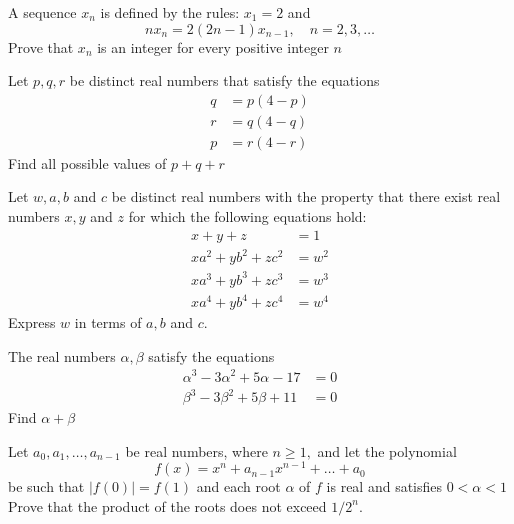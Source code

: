 \documentclass{pset}
\begin{document}
\begin{problems}
\begin{problem}[IrMO 1994 Q1]
    A sequence \(x_{n}\) is defined by the rules: \(x_{1}=2\) and
    $$
    n x_{n}=2(2 n-1) x_{n-1}, \quad n=2,3, \ldots
    $$
    Prove that \(x_{n}\) is an integer for every positive integer \(n\)
\end{problem}

\begin{problem}[IrMO 1994 Q7]
    Let \(p, q, r\) be distinct real numbers that satisfy the equations
    $$
    \begin{aligned}
    q &=p(4-p) \\
    r &=q(4-q) \\
    p &=r(4-r)
    \end{aligned}
    $$
    Find all possible values of \(p+q+r\)
\end{problem}

\begin{problem}[IrMO 1994 Q9]
    Let \(w, a, b\) and \(c\) be distinct real numbers with the property that there exist real numbers \(x, y\) and \(z\) for which the following equations hold:
    $$
    \begin{aligned}
    x+y+z &=1 \\
    x a^{2}+y b^{2}+z c^{2} &=w^{2} \\
    x a^{3}+y b^{3}+z c^{3} &=w^{3} \\
    x a^{4}+y b^{4}+z c^{4} &=w^{4}
    \end{aligned}
    $$
    Express \(w\) in terms of \(a, b\) and \(c .\)
\end{problem}

\begin{problem}[IrMO 1993 Q1]
    The real numbers \(\alpha, \beta\) satisfy the equations
    $$
    \begin{aligned}
    \alpha^{3}-3 \alpha^{2}+5 \alpha-17 &=0 \\
    \beta^{3}-3 \beta^{2}+5 \beta+11 &=0
    \end{aligned}
    $$
    Find \(\alpha+\beta\)
\end{problem}

\begin{problem}[IrMO 1993 Q4]
    Let \(a_{0}, a_{1}, \ldots, a_{n-1}\) be real numbers, where \(n \geq 1,\) and let the polynomial
    $$
    f(x)=x^{n}+a_{n-1} x^{n-1}+\ldots+a_{0}
    $$
    be such that \(|f(0)|=f(1)\) and each root \(\alpha\) of \(f\) is real and satisfies \(0<\alpha<1\) Prove that the product of the roots does not exceed \(1 / 2^{n}\).
\end{problem}




\end{problems}
\end{document}
